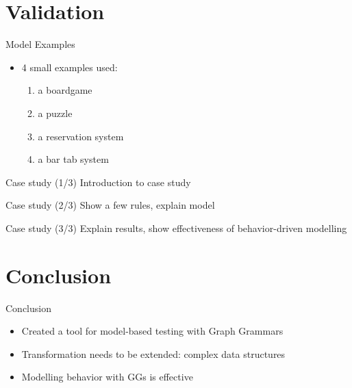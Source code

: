 \documentclass{FMTslides}
\begin{document}
\section[Validation]{Validation}

\begin{frame}{Model Examples}
\begin{itemize}[<+->]
  \item 4 small examples used:
  \begin{enumerate}
    \item a boardgame
    \item a puzzle
    \item a reservation system
    \item a bar tab system
  \end{enumerate}
\end{itemize}
\end{frame}

\begin{frame}{Case study (1/3)}
  Introduction to case study
\end{frame}

\begin{frame}{Case study (2/3)}
  Show a few rules, explain model
\end{frame}

\begin{frame}{Case study (3/3)}
  Explain results, show effectiveness of behavior-driven modelling
\end{frame}

\section[Conclusion]{Conclusion}

\begin{frame}{Conclusion}
  \begin{itemize}[<+->]
    \item Created a tool for model-based testing with Graph Grammars
    \item Transformation needs to be extended: complex data structures
    \item Modelling behavior with GGs is effective
  \end{itemize}
\end{frame}
\end{document}
